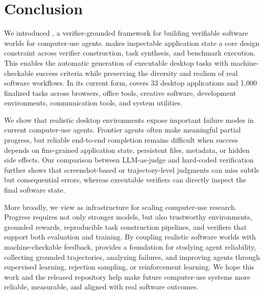 \section{Conclusion}
\label{sec:conclusion}
We introduced \textbf{\ours}, a verifier-grounded framework for building verifiable software worlds for computer-use agents. \ours makes inspectable application state a core design constraint across verifier construction, task synthesis, and benchmark execution. This enables the automatic generation of executable desktop tasks with machine-checkable success criteria while preserving the diversity and realism of real software workflows. In its current form, \ours covers 33 desktop applications and 1,000 finalized tasks across browsers, office tools, creative software, development environments, communication tools, and system utilities.

We show that realistic desktop environments expose important failure modes in current computer-use agents. Frontier agents often make meaningful partial progress, but reliable end-to-end completion remains difficult when success depends on fine-grained application state, persistent files, metadata, or hidden side effects. Our comparison between LLM-as-judge and hard-coded verification further shows that screenshot-based or trajectory-level judgments can miss subtle but consequential errors, whereas executable verifiers can directly inspect the final software state.

More broadly, we view \ours as infrastructure for scaling computer-use research. Progress requires not only stronger models, but also trustworthy environments, grounded rewards, reproducible task construction pipelines, and verifiers that support both evaluation and training. By coupling realistic software worlds with machine-checkable feedback, \ours provides a foundation for studying agent reliability, collecting grounded trajectories, analyzing failures, and improving agents through supervised learning, rejection sampling, or reinforcement learning. We hope this work and the released repository help make future computer-use systems more reliable, measurable, and aligned with real software outcomes.